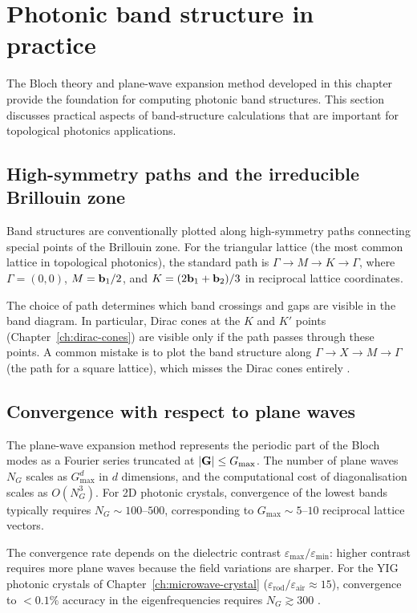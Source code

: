 \section{Photonic band structure in practice}
\label{sec:ch4-practical-bands}

The Bloch theory and plane-wave expansion method developed in this
chapter provide the foundation for computing photonic band structures.
This section discusses practical aspects of band-structure
calculations that are important for topological photonics
applications.

\subsection{High-symmetry paths and the irreducible Brillouin zone}
\label{sec:ch4-high-symmetry-paths}

Band structures are conventionally plotted along high-symmetry
paths connecting special points of the Brillouin zone.  For the
triangular lattice (the most common lattice in topological photonics),
the standard path is $\Gamma\to M\to K\to\Gamma$, where
$\Gamma=(0,0)$, $M=\mathbf{b}_1/2$, and $K=(2\mathbf{b}_1+\mathbf{b}_2)/3$ in
reciprocal lattice coordinates.

The choice of path determines which band crossings and gaps are
visible in the band diagram.  In particular, Dirac cones at the $K$
and $K'$ points (Chapter~\ref{ch:dirac-cones}) are visible only if
the path passes through these points.  A common mistake is to plot
the band structure along $\Gamma\to X\to M\to\Gamma$ (the path
for a square lattice), which misses the Dirac cones entirely
\cite{press2026photonic,initio2026pdf}.

\subsection{Convergence with respect to plane waves}
\label{sec:ch4-pwe-convergence}

The plane-wave expansion method represents the periodic part of the
Bloch modes as a Fourier series truncated at $|\mathbf{G}|\leq G_{\max}$.
The number of plane waves $N_G$ scales as $G_{\max}^d$ in $d$
dimensions, and the computational cost of diagonalisation scales
as $O(N_G^3)$.  For 2D photonic crystals, convergence of the lowest
bands typically requires $N_G \sim 100$--$500$, corresponding to
$G_{\max} \sim 5$--$10$ reciprocal lattice vectors.

The convergence rate depends on the dielectric contrast
$\varepsilon_{\max}/\varepsilon_{\min}$: higher contrast requires
more plane waves because the field variations are sharper.  For
the YIG photonic crystals of Chapter~\ref{ch:microwave-crystal}
($\varepsilon_{\mathrm{rod}}/\varepsilon_{\mathrm{air}} \approx 15$),
convergence to $<0.1\%$ accuracy in the eigenfrequencies requires
$N_G \gtrsim 300$ \cite{zhao2020first,press2026photonic}.

